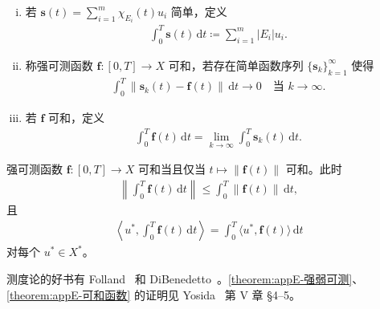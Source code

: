 \documentclass[../main.tex]{subfiles}
\begin{document}
\begin{definition}\label{definition:appE-Bochner积分}
\begin{enumerate}[(i)]
\item 若 $\mathbf{s}(t)=\sum_{i=1}^m\chi_{E_i}(t)u_i$ 简单，定义
\begin{align}
\int_0^T\mathbf{s}(t)\,\mathrm{d}t\coloneqq\sum_{i=1}^m|E_i|u_i.
\label{align:appE-简单积分}
\end{align}

\item 称强可测函数 $\mathbf{f}:[0,T]\to X$ 可和，若存在简单函数序列 $\{\mathbf{s}_k\}_{k=1}^\infty$ 使得
\begin{align}
\int_0^T\|\mathbf{s}_k(t)-\mathbf{f}(t)\|\,\mathrm{d}t\to 0 \quad \text{当 } k\to\infty.
\label{align:appE-可和条件}
\end{align}

\item 若 $\mathbf{f}$ 可和，定义
\begin{align}
\int_0^T\mathbf{f}(t)\,\mathrm{d}t=\lim_{k\to\infty}\int_0^T\mathbf{s}_k(t)\,\mathrm{d}t.
\label{align:appE-Bochner积分}
\end{align}
\end{enumerate}
\end{definition}

\begin{theorem}[可和函数。]\label{theorem:appE-可和函数}强可测函数 $\mathbf{f}:[0,T]\to X$ 可和当且仅当 $t\mapsto\|\mathbf{f}(t)\|$ 可和。此时
\begin{align*}
\left\|\int_0^T\mathbf{f}(t)\,\mathrm{d}t\right\|\leqslant\int_0^T\|\mathbf{f}(t)\|\,\mathrm{d}t,
\end{align*}
且
\begin{align*}
\left\langle u^*,\int_0^T\mathbf{f}(t)\,\mathrm{d}t\right\rangle=\int_0^T\langle u^*,\mathbf{f}(t)\rangle\,\mathrm{d}t
\end{align*}
对每个 $u^*\in X^*$。
\end{theorem}

测度论的好书有 Folland~\cite{F2} 和 DiBenedetto~\cite{DB2}。\cref{theorem:appE-强弱可测}、\cref{theorem:appE-可和函数} 的证明见 Yosida~\cite{Y} 第 V 章 \S4--5。
\end{document}
